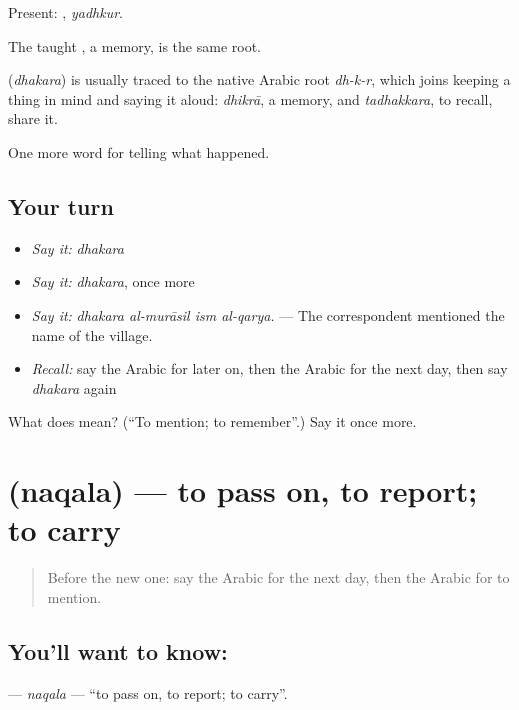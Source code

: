 Present: , \emph{yadhkur}.

The taught , a memory, is the same root.

\begin{cousinweb}
\textbf{} (\emph{dhakara}) is usually traced to the native Arabic root \emph{dh-k-r}, which joins keeping a thing in mind and saying it aloud: \emph{dhikrā}, a memory, and \emph{tadhakkara}, to recall, share it.
\end{cousinweb}

\begin{grammarlens}[title={What you've built}]
One more word for telling what happened.
\end{grammarlens}

\subsection*{Your turn}
\begin{itemize}
\raggedright
  \item \emph{Say it:} \emph{dhakara}
  \item \emph{Say it:} \emph{dhakara}, once more
  \item \emph{Say it:} \emph{dhakara al-murāsil ism al-qarya.} — The correspondent mentioned the name of the village.
  \item \emph{Recall:} say the Arabic for later on, then the Arabic for the next day, then say \emph{dhakara} again
\end{itemize}

\begin{tcolorbox}[breakable,colback=teal!4,colframe=teal!35!black,title={Before you move on}]
What does  mean? (\textquotedblleft{}To mention; to remember\textquotedblright{}.) Say it once more.
\end{tcolorbox}
\section[\texorpdfstring{\ar{نقل} (naqala)}{نقل (naqala)}]{ (naqala) — to pass on, to report; to carry}

\label{lesson:AR-C299-naqala}



\begin{quote}
Before the new one: say the Arabic for the next day, then the Arabic for to mention.
\end{quote}

\subsection*{You'll want to know: }
\textbf{} — \emph{naqala} — \textquotedblleft{}to pass on, to report; to carry\textquotedblright{}.

